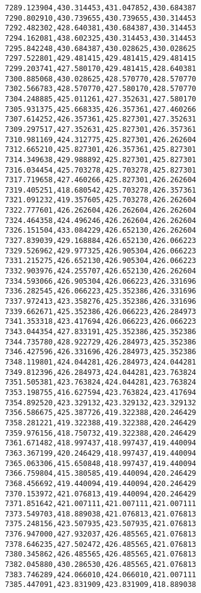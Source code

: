 \documentclass[11pt]{article}
\begin{document}
\begin{Verbatim}[commandchars=\\\{\}]
7289.123904,430.314453,431.047852,430.684387
7290.802910,430.739655,430.739655,430.314453
7292.482302,428.640381,430.684387,430.314453
7294.162081,438.602325,430.314453,430.314453
7295.842248,430.684387,430.028625,430.028625
7297.522801,429.481415,429.481415,429.481415
7299.203741,427.580170,429.481415,428.640381
7300.885068,430.028625,428.570770,428.570770
7302.566783,428.570770,427.580170,428.570770
7304.248885,425.011261,427.352631,427.580170
7305.931375,425.668335,426.357361,427.460266
7307.614252,426.357361,425.827301,427.352631
7309.297517,427.352631,425.827301,426.357361
7310.981169,424.312775,425.827301,426.262604
7312.665210,425.827301,426.357361,425.827301
7314.349638,429.988892,425.827301,425.827301
7316.034454,425.703278,425.703278,425.827301
7317.719658,427.460266,425.827301,426.262604
7319.405251,418.680542,425.703278,426.357361
7321.091232,419.357605,425.703278,426.262604
7322.777601,426.262604,426.262604,426.262604
7324.464358,424.496246,426.262604,426.262604
7326.151504,433.084229,426.652130,426.262604
7327.839039,429.168884,426.652130,426.066223
7329.526962,429.977325,426.905304,426.066223
7331.215275,426.652130,426.905304,426.066223
7332.903976,424.255707,426.652130,426.262604
7334.593066,426.905304,426.066223,426.331696
7336.282545,426.066223,425.352386,426.331696
7337.972413,423.358276,425.352386,426.331696
7339.662671,425.352386,426.066223,426.284973
7341.353318,423.417694,426.066223,426.066223
7343.044354,427.833191,425.352386,425.352386
7344.735780,428.922729,426.284973,425.352386
7346.427596,426.331696,426.284973,425.352386
7348.119801,424.044281,426.284973,424.044281
7349.812396,426.284973,424.044281,423.763824
7351.505381,423.763824,424.044281,423.763824
7353.198755,416.627594,423.763824,423.417694
7354.892520,423.329132,423.329132,423.329132
7356.586675,425.387726,419.322388,420.246429
7358.281221,419.322388,419.322388,420.246429
7359.976156,418.750732,419.322388,420.246429
7361.671482,418.997437,418.997437,419.440094
7363.367199,420.246429,418.997437,419.440094
7365.063306,415.650848,418.997437,419.440094
7366.759804,415.380585,419.440094,420.246429
7368.456692,419.440094,419.440094,420.246429
7370.153972,421.076813,419.440094,420.246429
7371.851642,421.007111,421.007111,421.007111
7373.549703,418.889038,421.076813,421.076813
7375.248156,423.507935,423.507935,421.076813
7376.947000,427.932037,426.485565,421.076813
7378.646235,427.502472,426.485565,421.076813
7380.345862,426.485565,426.485565,421.076813
7382.045880,430.286530,426.485565,421.076813
7383.746289,424.066010,424.066010,421.007111
7385.447091,423.831909,423.831909,418.889038

\end{Verbatim}
\end{document}
